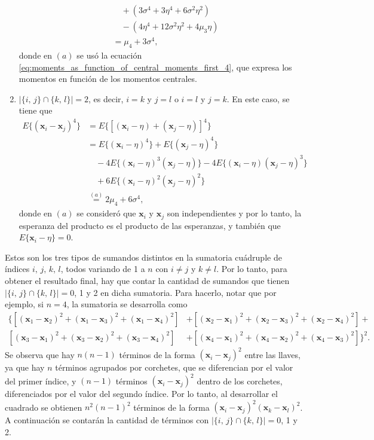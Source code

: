 \documentclass[a4paper]{report}
\newcommand{\x}{\mathbf{x}}
\begin{document}
\begin{enumerate}
\begin{align*}
   &\quad+(3\sigma^4+3\eta^4+6\sigma^2\eta^2)\\
   &\quad-(4\eta^4+12\sigma^2\eta^2+4\mu_3\eta)\\
   &=\mu_4+3\sigma^4,
 \end{align*}
 donde en \((a)\) se usó la ecuación \ref{eq:moments_as_function_of_central_moments_first_4}, que expresa los momentos en función de los momentos centrales.
 \item \(|\{i,\,j\}\cap\{k,\,l\}|=2\), es decir, \(i=k\) y \(j=l\) o \(i=l\) y \(j=k\). En este caso, se tiene que
 \begin{align*}
  E\{(\x_i-\x_j)^4\}&=E\{\left[(\x_i-\eta)+(\x_j-\eta)\right]^4\}\\
    &=E\{(\x_i-\eta)^4\}+E\{(\x_j-\eta)^4\}\\
    &\quad-4E\{(\x_i-\eta)^3(\x_j-\eta)\}-4E\{(\x_i-\eta)(\x_j-\eta)^3\}\\
    &\quad+6E\{(\x_i-\eta)^2(\x_j-\eta)^2\}\\
    &\overset{(a)}{=}2\mu_4+6\sigma^4,
 \end{align*}
donde en \((a)\) se consideró que \(\x_i\) y \(\x_j\) son independientes y por lo tanto, la esperanza del producto es el producto de las esperanzas, y también que \(E\{\x_i-\eta\}=0\).
 \end{enumerate}
Estos son los tres tipos de sumandos distintos en la sumatoria cuádruple de índices \(i,\,j,\,k,\,l\), todos variando de 1 a \(n\) con \(i\neq j\) y \(k\neq l\). Por lo tanto, para obtener el resultado final, hay que contar la cantidad de sumandos que tienen \(|\{i,\,j\}\cap\{k,\,l\}|=0\), 1 y 2 en dicha sumatoria. Para hacerlo, notar que por ejemplo, si \(n=4\), la sumatoria se desarrolla como
\begin{align*}
 \bigl\{\left[(\x_1-\x_2)^2+(\x_1-\x_3)^2+(\x_1-\x_4)^2\right]&+\left[(\x_2-\x_1)^2+(\x_2-\x_3)^2+(\x_2-\x_4)^2\right]+\\
 \left[(\x_3-\x_1)^2+(\x_3-\x_2)^2+(\x_3-\x_4)^2\right]&+\left[(\x_4-\x_1)^2+(\x_4-\x_2)^2+(\x_4-\x_3)^2\right]\bigr\}^2.
\end{align*}
Se observa que hay \(n(n-1)\) términos de la forma \((\x_i-\x_j)^2\) entre las llaves, ya que hay \(n\) términos agrupados por corchetes, que se diferencian por el valor del primer índice, y \((n-1)\) términos \((\x_i-\x_j)^2\) dentro de los corchetes, diferenciados por el valor del segundo índice. Por lo tanto, al desarrollar el cuadrado se obtienen \(n^2(n-1)^2\) términos de la forma \((\x_i-\x_j)^2(\x_k-\x_l)^2\). A continuación se contarán la cantidad de términos con \(|\{i,\,j\}\cap\{k,\,l\}|=0\), 1 y 2.
\end{document}
